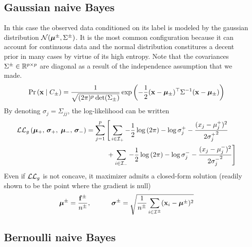 \subsection{Gaussian naive Bayes}\label{subsec:gnb}

In this case the observed data conditioned on its label is modeled by the gaussian distribution
$\mathcal{N}( \bm{\mu}^\pm, \Sigma^\pm )$.
It is the most common configuration because it can account for continuous data and the normal distribution constitures
a decent prior in many cases by virtue of its high entropy.
Note that the covariances $\Sigma^\pm \in \mathbb{R}^{p \times p}$
are diagonal as a result of the independence assumption that we made.
\begin{equation*}
    \Pr\left( \mathbf{x} \mid C_\pm \right) =
    \frac{1}{\sqrt{(2\pi)^p\det(\Sigma_\pm)}}
    \exp\left( -\frac{1}{2}(\mathbf{x} - \bm{\mu}_\pm)^\top\Sigma^{-1}(\mathbf{x} - \bm{\mu}_\pm) \right)
\end{equation*}
By denoting $\sigma_j = \Sigma_{j j}$, the log-likelihood can be written
\begin{equation*}
    \begin{split}
        \mathcal{L}\mathcal{L}_g\left( \bm{\mu}_+,\, \bm{\sigma}_+,\; \bm{\mu}_-,\, \bm{\sigma}_-\right ) &=
            \sum_{j = 1}^p \Bigg[
                \sum_{i \in \mathcal{I}_+}
                    -\frac{1}{2} \log \left( 2\pi \right)
                    -\log \sigma_j^+
                    -\frac{(x_j - \mu^+_j)^2}{2{\sigma^+_j}^2}\\
                &\qquad\quad+ \sum_{i \in \mathcal{I}_-}
                    -\frac{1}{2} \log \left( 2\pi \right)
                    -\log \sigma_j^-
                    -\frac{(x_j - \mu^-_j)^2}{2{\sigma^-_j}^2}
            \Bigg]
    \end{split}
\end{equation*}
Even if $\mathcal{L}\mathcal{L}_g$ is not concave, it maximizer admits a closed-form solution
(readily shown to be the point where the gradient is null)
\begin{align*}
    \bm{\mu}^\pm = \frac{\mathbf{f}^\pm}{n^\pm}
    ,\qquad\quad
    \bm{\sigma}^\pm = \sqrt{\frac{1}{n^\pm} \sum_{i \in \mathcal{I}^\pm} (\mathbf{x}_i - \bm{\mu}^\pm)^2}
\end{align*}

\subsection{Bernoulli naive Bayes}\label{subsec:bnb}

